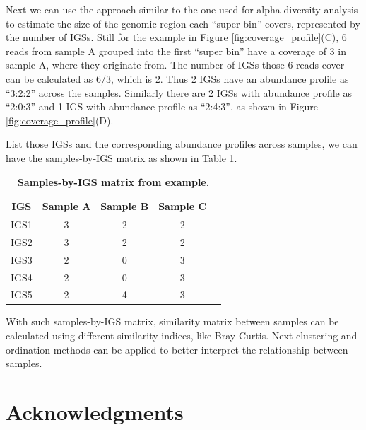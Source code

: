 \documentclass{article}
\begin{document}
Next we can use the approach similar to the one used for alpha diversity analysis
to estimate the size of the genomic region each ``super bin'' covers, represented
by the number of IGSs. Still for the example in Figure \ref{fig:coverage_profile}(C),
6 reads from sample A grouped into the first ``super bin'' have a coverage of 3 
in sample A, where they originate from. The number of IGSs those 6 reads cover can be calculated as $6/3$, which is 2. 
Thus 2 IGSs have an abundance profile as ``3:2:2'' across the samples.
Similarly there are 2 IGSs with abundance profile as ``2:0:3'' and 1 IGS 
with abundance profile as ``2:4:3'', as shown in Figure \ref{fig:coverage_profile}(D).

List those IGSs and the corresponding abundance profiles across samples,
we can have the samples-by-IGS matrix as shown in Table \ref{table:sample_IGS_table}.


\begin{table}[!ht]
\centering
\begin{tabular}{ |c | c |c| c|c| }
\hline 
    IGS & Sample A & Sample B & Sample C\\
\hline 
IGS1 & 3 & 2 & 2\\ 
IGS2 & 3 & 2 & 2\\ 
IGS3 & 2 & 0 & 3\\ 
IGS4 & 2 & 0 & 3\\ 
IGS5 & 2 & 4 & 3\\ 
\hline 
\end{tabular}
\caption{\bf Samples-by-IGS matrix from example.}
\label{table:sample_IGS_table}
\end{table}



With such samples-by-IGS matrix, similarity matrix between samples can be calculated using different similarity indices, like 
Bray-Curtis. Next clustering and ordination methods can be applied to better interpret the relationship between samples. 
    
    

\section{Acknowledgments}
\end{document}
